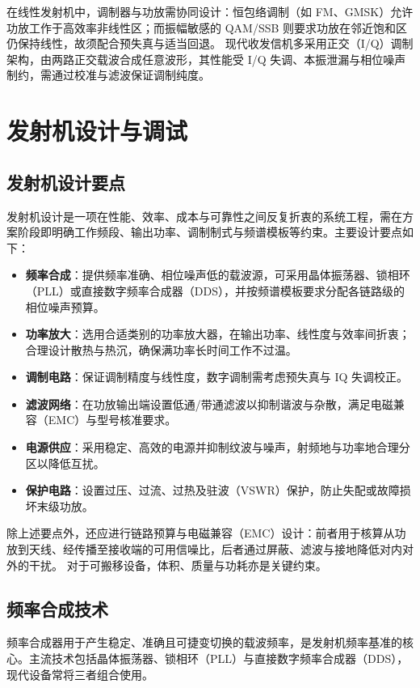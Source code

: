 在线性发射机中，调制器与功放需协同设计：恒包络调制（如 FM、GMSK）允许功放工作于高效率非线性区；而振幅敏感的 QAM/SSB 则要求功放在邻近饱和区仍保持线性，故须配合预失真与适当回退。
现代收发信机多采用正交（I/Q）调制架构，由两路正交载波合成任意波形，其性能受 I/Q 失调、本振泄漏与相位噪声制约，需通过校准与滤波保证调制纯度。

\section{发射机设计与调试}
\label{sec:transmitter_design}

\subsection{发射机设计要点}

发射机设计是一项在性能、效率、成本与可靠性之间反复折衷的系统工程，需在方案阶段即明确工作频段、输出功率、调制制式与频谱模板等约束。主要设计要点如下：

\begin{itemize}
    \item \textbf{频率合成}：提供频率准确、相位噪声低的载波源，可采用晶体振荡器、锁相环（PLL）或直接数字频率合成器（DDS），并按频谱模板要求分配各链路级的相位噪声预算。
    \item \textbf{功率放大}：选用合适类别的功率放大器，在输出功率、线性度与效率间折衷；合理设计散热与热沉，确保满功率长时间工作不过温。
    \item \textbf{调制电路}：保证调制精度与线性度，数字调制需考虑预失真与 IQ 失调校正。
    \item \textbf{滤波网络}：在功放输出端设置低通/带通滤波以抑制谐波与杂散，满足电磁兼容（EMC）与型号核准要求。
    \item \textbf{电源供应}：采用稳定、高效的电源并抑制纹波与噪声，射频地与功率地合理分区以降低互扰。
    \item \textbf{保护电路}：设置过压、过流、过热及驻波（VSWR）保护，防止失配或故障损坏末级功放。
\end{itemize}

除上述要点外，还应进行链路预算与电磁兼容（EMC）设计：前者用于核算从功放到天线、经传播至接收端的可用信噪比，后者通过屏蔽、滤波与接地降低对内对外的干扰。
对于可搬移设备，体积、质量与功耗亦是关键约束。

\subsection{频率合成技术}

频率合成器用于产生稳定、准确且可捷变切换的载波频率，是发射机频率基准的核心。主流技术包括晶体振荡器、锁相环（PLL）与直接数字频率合成器（DDS），现代设备常将三者组合使用。

